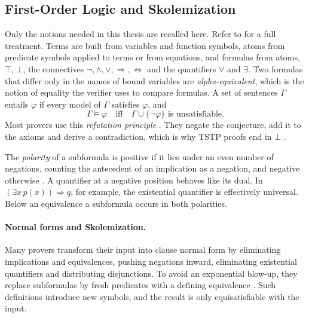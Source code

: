 \subsection{First-Order Logic and Skolemization}
\label{subsec:fol}

Only the notions needed in this thesis are recalled here.
Refer to \citet{Fitting1996} for a full treatment.
Terms are built from variables and function symbols, atoms from predicate symbols applied to terms or from equations, and formulas from atoms, $\top$, $\bot$, the connectives $\neg, \wedge, \vee, \Rightarrow, \Leftrightarrow$ and the quantifiers $\forall$ and $\exists$.
Two formulas that differ only in the names of bound variables are \emph{alpha-equivalent}, which is the notion of equality the verifier uses to compare formulas.
A set of sentences $\Gamma$ entails $\varphi$ if every model of $\Gamma$ satisfies $\varphi$, and
\begin{equation}
  \Gamma \models \varphi \quad\text{iff}\quad \Gamma \cup \{\neg\varphi\} \text{ is unsatisfiable.}
  \label{eq:refutation}
\end{equation}
Most provers use this \emph{refutation principle} \citep{Robinson1965}. They negate the conjecture, add it to the axioms and derive a contradiction, which is why TSTP proofs end in $\bot$ \citep{SutcliffeSCV2006}.

The \emph{polarity} of a subformula is positive if it lies under an even number of negations, counting the antecedent of an implication as a negation, and negative otherwise \citep{NonnengartWeidenbach2001}.
A quantifier at a negative position behaves like its dual. In $(\exists x\, p(x)) \Rightarrow q$, for example, the existential quantifier is effectively universal.
Below an equivalence a subformula occurs in both polarities.

\paragraph{Normal forms and Skolemization.}
\label{subsec:normal-forms}

Many provers transform their input into clause normal form by eliminating implications and equivalences, pushing negations inward, eliminating existential quantifiers and distributing disjunctions.
To avoid an exponential blow-up, they replace subformulas by fresh predicates with a defining equivalence \citep{Tseitin1983,PlaistedGreenbaum1986,NonnengartWeidenbach2001}.
Such definitions introduce new symbols, and the result is only equisatisfiable with the input.

